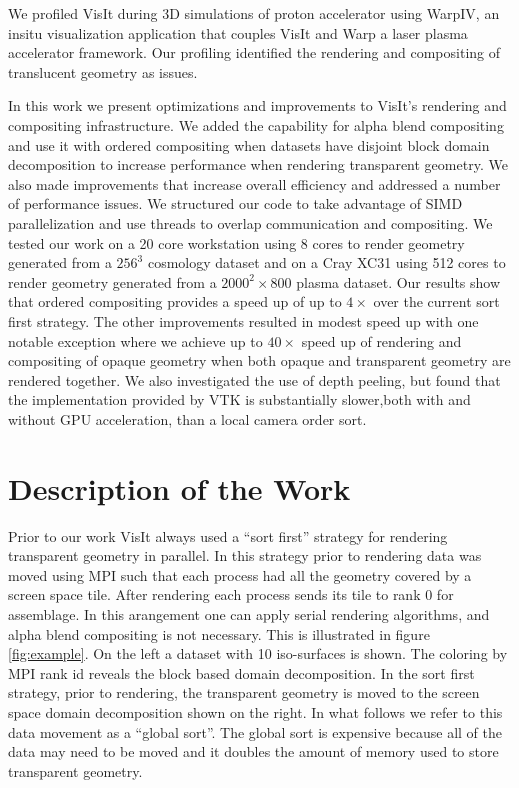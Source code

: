 \documentclass[a4paper,10pt]{report}
\begin{document}
We profiled VisIt during 3D simulations of proton accelerator\cite{stepan, olvier} using WarpIV\cite{warpiv}, an insitu visualization application that couples VisIt and Warp\cite{warp} a laser plasma accelerator framework. Our profiling identified the rendering and compositing of translucent geometry as issues.

In this work we present optimizations and improvements to VisIt's rendering and compositing infrastructure. We added the capability for alpha blend compositing and use it with ordered compositing when datasets have disjoint block domain decomposition to increase performance when rendering transparent geometry. We also made improvements that increase overall efficiency and addressed a number of performance issues. We structured our code to take advantage of SIMD parallelization and use threads to overlap communication and compositing. We tested our work on a 20 core workstation using 8 cores to render geometry generated from a $256^3$ cosmology dataset and on a Cray XC31 using 512 cores to render geometry generated from a $2000^2 \times 800$ plasma dataset. Our results show that ordered compositing provides a speed up of up to $4 \times$ over the current sort first strategy. The other improvements resulted in modest speed up with one notable exception where we achieve up to $40 \times$ speed up of rendering and compositing of opaque geometry when both opaque and transparent geometry are rendered together. We also investigated the use of depth peeling, but found that the implementation provided by VTK is substantially slower,both with and without GPU acceleration, than a local camera order sort.

\section{Description of the Work}
Prior to our work VisIt always used a ``sort first'' strategy for rendering transparent geometry in parallel. In this strategy prior to rendering data was moved using MPI such that each process had all the geometry covered by a screen space tile. After rendering each process sends its tile to rank 0 for assemblage. In this arangement one can apply serial rendering algorithms, and alpha blend compositing is not necessary. This is illustrated in figure \ref{fig:example}. On the left a dataset with 10 iso-surfaces is shown. The coloring by MPI rank id reveals the block based domain decomposition. In the sort first strategy, prior to rendering, the transparent geometry is moved to the screen space domain decomposition shown on the right. In what follows we refer to this data movement as a ``global sort''. The global sort is expensive because all of the data may need to be moved and it doubles the amount of memory used to store transparent geometry.
\end{document}
